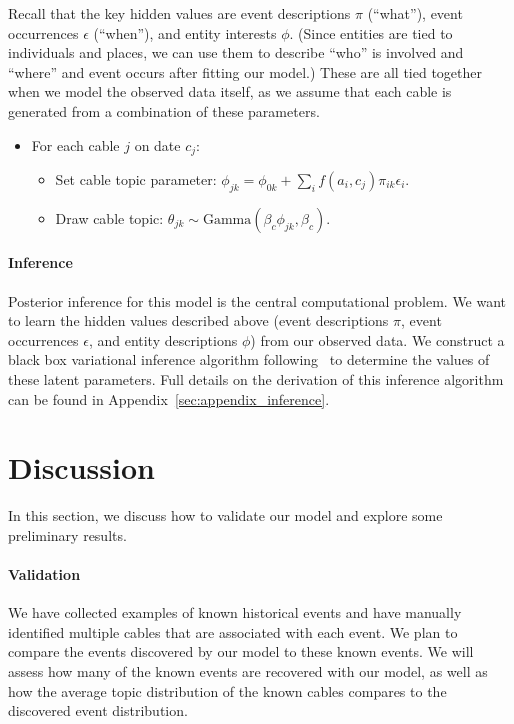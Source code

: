 Recall that the key hidden values are event descriptions $\pi$ (``what''), event occurrences $\epsilon$ (``when''), and entity interests $\phi$.  (Since entities are tied to individuals and places, we can use them to describe ``who'' is involved and ``where'' and event occurs after fitting our model.)  These are all tied together when we model the observed data itself, as we assume that each cable is generated from a combination of these parameters.
\begin{itemize}
\item For each cable $j$ on date $c_j$:
\begin{itemize}
	\item Set cable topic parameter: $\phi_{jk} = \phi_{0k} + \sum_i f(a_i, c_j) \pi_{ik} \epsilon_i$.
	\item Draw cable topic: $\theta_{jk} \sim \mbox{Gamma}(\beta_c \phi_{jk}, \beta_c)$.
\end{itemize}
\end{itemize}



\paragraph{Inference}
Posterior inference for this model is the central computational problem.  We want to learn the hidden values described above (event descriptions $\pi$, event occurrences $\epsilon$, and entity descriptions $\phi$) from our observed data.  We construct a black box variational inference algorithm following~\citet{Ranganath:2014} to determine the values of these latent parameters.  Full details on the derivation of this inference algorithm can be found in Appendix~\ref{sec:appendix_inference}.

\section{Discussion}
In this section, we discuss how to validate our model and explore some preliminary results.

\paragraph{Validation}
We have collected examples of known historical events and have manually identified multiple cables that are associated with each event.  We plan to compare the events discovered by our model to these known events.  We will assess how many of the known events are recovered with our model, as well as how the average topic distribution of the known cables compares to the discovered event distribution.

